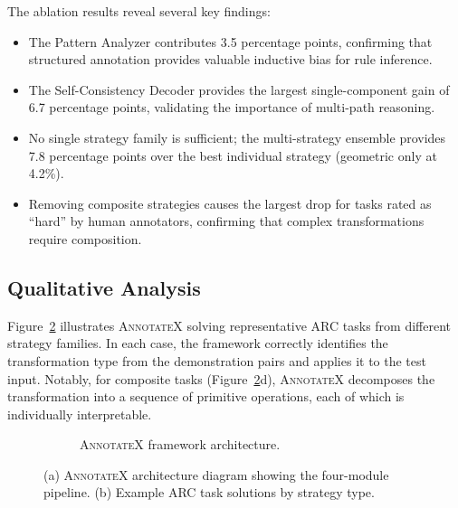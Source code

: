 \documentclass[conference,10pt,letterpaper]{IEEEtran}
\newcommand{\annotatexname}{\textsc{AnnotateX}}
\begin{document}
The ablation results reveal several key findings:
\begin{itemize}[leftmargin=*,nosep]
    \item The Pattern Analyzer contributes 3.5 percentage points, confirming that structured annotation provides valuable inductive bias for rule inference.
    \item The Self-Consistency Decoder provides the largest single-component gain of 6.7 percentage points, validating the importance of multi-path reasoning.
    \item No single strategy family is sufficient; the multi-strategy ensemble provides 7.8 percentage points over the best individual strategy (geometric only at 4.2\%).
    \item Removing composite strategies causes the largest drop for tasks rated as ``hard'' by human annotators, confirming that complex transformations require composition.
\end{itemize}

\subsection{Qualitative Analysis}

Figure~\ref{fig:examples} illustrates \annotatexname{} solving representative ARC tasks from different strategy families. In each case, the framework correctly identifies the transformation type from the demonstration pairs and applies it to the test input. Notably, for composite tasks (Figure~\ref{fig:examples}d), \annotatexname{} decomposes the transformation into a sequence of primitive operations, each of which is individually interpretable.

\begin{figure}[t]
\centering
\begin{subfigure}[b]{0.45\textwidth}
    \centering
    
    \caption{\annotatexname{} framework architecture.}
    \label{fig:arch}
\end{subfigure}
\vfill
\begin{subfigure}[b]{0.45\textwidth}
    \centering
\end{subfigure}
\caption{(a) \annotatexname{} architecture diagram showing the four-module pipeline. (b) Example ARC task solutions by strategy type.}
\label{fig:examples}
\end{figure}
\end{document}
